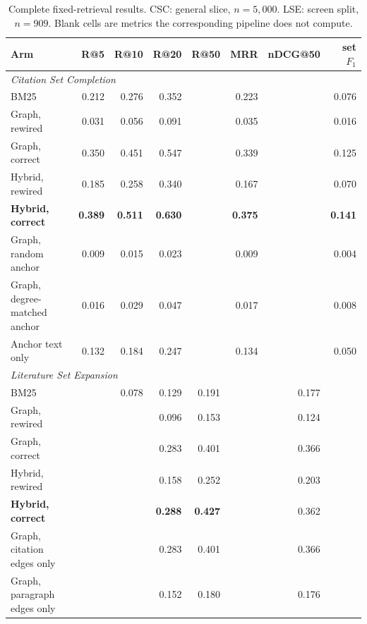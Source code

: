 \begin{table}[t]
\centering
\small
\caption{Complete fixed-retrieval results. CSC: general slice, $n{=}5{,}000$. LSE: screen split,
$n{=}909$. Blank cells are metrics the corresponding pipeline does not compute.}
\label{tab:ar-fixed}
\begin{tabular}{lrrrrrrr}
\toprule
Arm & R@5 & R@10 & R@20 & R@50 & MRR & nDCG@50 & set $F_1$ \\
\midrule
\multicolumn{8}{l}{\emph{Citation Set Completion}} \\
BM25 & 0.212 & 0.276 & 0.352 & & 0.223 & & 0.076 \\
Graph, rewired & 0.031 & 0.056 & 0.091 & & 0.035 & & 0.016 \\
Graph, correct & 0.350 & 0.451 & 0.547 & & 0.339 & & 0.125 \\
Hybrid, rewired & 0.185 & 0.258 & 0.340 & & 0.167 & & 0.070 \\
\textbf{Hybrid, correct} & \textbf{0.389} & \textbf{0.511} & \textbf{0.630} & & \textbf{0.375} & & \textbf{0.141} \\
Graph, random anchor & 0.009 & 0.015 & 0.023 & & 0.009 & & 0.004 \\
Graph, degree-matched anchor & 0.016 & 0.029 & 0.047 & & 0.017 & & 0.008 \\
Anchor text only & 0.132 & 0.184 & 0.247 & & 0.134 & & 0.050 \\
\midrule
\multicolumn{8}{l}{\emph{Literature Set Expansion}} \\
BM25 & & 0.078 & 0.129 & 0.191 & & 0.177 & \\
Graph, rewired & & & 0.096 & 0.153 & & 0.124 & \\
Graph, correct & & & 0.283 & 0.401 & & 0.366 & \\
Hybrid, rewired & & & 0.158 & 0.252 & & 0.203 & \\
\textbf{Hybrid, correct} & & & \textbf{0.288} & \textbf{0.427} & & 0.362 & \\
Graph, citation edges only & & & 0.283 & 0.401 & & 0.366 & \\
Graph, paragraph edges only & & & 0.152 & 0.180 & & 0.176 & \\
\bottomrule
\end{tabular}
\end{table}


